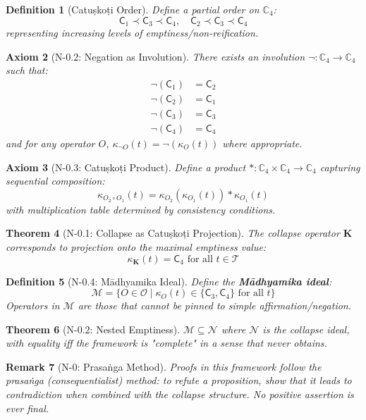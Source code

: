 \documentclass[12pt, oneside]{article}
\newtheorem{theorem}{Theorem}[section]
\newtheorem{definition}[theorem]{Definition}
\newtheorem{axiom}[theorem]{Axiom}
\newtheorem{remark}[theorem]{Remark}
\newcommand{\K}{\mathbf{K}}
\newcommand{\N}{\mathcal{N}}
\newcommand{\T}{\mathcal{T}}
\newcommand{\Opr}{\mathcal{O}}
\newcommand{\mc}[1]{\mathcal{#1}}
\newcommand{\catkoone}{\mathsf{C}_1}
\newcommand{\catkotwo}{\mathsf{C}_2}
\newcommand{\catkothree}{\mathsf{C}_3}
\newcommand{\catkofour}{\mathsf{C}_4}
\begin{document}
\begin{definition}[Catuṣkoṭi Order]
Define a partial order on $\mathbb{C}_4$:
\[
\catkoone \prec \catkothree \prec \catkofour,\quad \catkotwo \prec \catkothree \prec \catkofour
\]
representing increasing levels of emptiness/non-reification.
\end{definition}

\begin{axiom}[N-0.2: Negation as Involution]
There exists an involution $\neg: \mathbb{C}_4 \rightarrow \mathbb{C}_4$ such that:
\begin{align*}
\neg(\catkoone) &= \catkotwo\\
\neg(\catkotwo) &= \catkoone\\
\neg(\catkothree) &= \catkothree\\
\neg(\catkofour) &= \catkofour
\end{align*}
and for any operator $O$, $\kappa_{\neg O}(t) = \neg(\kappa_O(t))$ where appropriate.
\end{axiom}

\begin{axiom}[N-0.3: Catuṣkoṭi Product]
Define a product $\ast: \mathbb{C}_4 \times \mathbb{C}_4 \rightarrow \mathbb{C}_4$ capturing sequential composition:
\[
\kappa_{O_2 \circ O_1}(t) = \kappa_{O_2}(\kappa_{O_1}(t)) \ast \kappa_{O_1}(t)
\]
with multiplication table determined by consistency conditions.
\end{axiom}

\begin{theorem}[N-0.1: Collapse as Catuṣkoṭi Projection]
The collapse operator $\K$ corresponds to projection onto the maximal emptiness value:
\[
\kappa_{\K}(t) = \catkofour \text{ for all } t \in \T
\]
\end{theorem}

\begin{definition}[N-0.4: Mādhyamika Ideal]
Define the \textbf{Mādhyamika ideal}:
\[
\mc{M} = \{O \in \Opr \mid \kappa_O(t) \in \{\catkothree, \catkofour\} \text{ for all } t\}
\]
Operators in $\mc{M}$ are those that cannot be pinned to simple affirmation/negation.
\end{definition}

\begin{theorem}[N-0.2: Nested Emptiness]
$\mc{M} \subseteq \N$ where $\N$ is the collapse ideal, with equality iff the framework is "complete" in a sense that never obtains.
\end{theorem}

\begin{remark}[N-0: Prasaṅga Method]
Proofs in this framework follow the \textit{prasaṅga} (consequentialist) method: to refute a proposition, show that it leads to contradiction when combined with the collapse structure. No positive assertion is ever final.
\end{remark}
\end{document}
